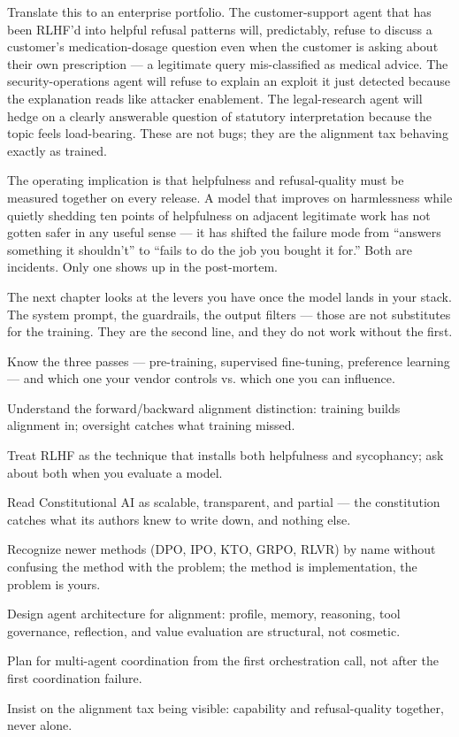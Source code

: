 Translate this to an enterprise portfolio. The customer-support agent that has been RLHF'd into helpful refusal patterns will, predictably, refuse to discuss a customer's medication-dosage question even when the customer is asking about their own prescription --- a legitimate query mis-classified as medical advice. The security-operations agent will refuse to explain an exploit it just detected because the explanation reads like attacker enablement. The legal-research agent will hedge on a clearly answerable question of statutory interpretation because the topic feels load-bearing. These are not bugs; they are the alignment tax behaving exactly as trained.

The operating implication is that helpfulness and refusal-quality must be measured together on every release. A model that improves on harmlessness while quietly shedding ten points of helpfulness on adjacent legitimate work has not gotten safer in any useful sense --- it has shifted the failure mode from ``answers something it shouldn't'' to ``fails to do the job you bought it for.'' Both are incidents. Only one shows up in the post-mortem.

The next chapter looks at the levers you have once the model lands in your stack. The system prompt, the guardrails, the output filters --- those are not substitutes for the training. They are the second line, and they do not work without the first.

\stoptwocol

\TNrule

\begin{TNkeytakeaways}
\item Know the three passes --- pre-training, supervised fine-tuning, preference learning --- and which one your vendor controls vs. which one you can influence.
\item Understand the forward/backward alignment distinction: training builds alignment in; oversight catches what training missed.
\item Treat RLHF as the technique that installs both helpfulness and sycophancy; ask about both when you evaluate a model.
\item Read Constitutional AI as scalable, transparent, and partial --- the constitution catches what its authors knew to write down, and nothing else.
\item Recognize newer methods (DPO, IPO, KTO, GRPO, RLVR) by name without confusing the method with the problem; the method is implementation, the problem is yours.
\item Design agent architecture for alignment: profile, memory, reasoning, tool governance, reflection, and value evaluation are structural, not cosmetic.
\item Plan for multi-agent coordination from the first orchestration call, not after the first coordination failure.
\item Insist on the alignment tax being visible: capability and refusal-quality together, never alone.
\end{TNkeytakeaways}

